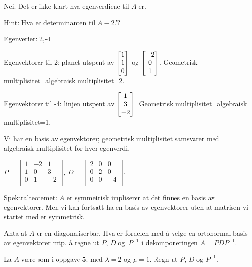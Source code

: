 \begin{losning}
\begin{punkt}
Nei. Det er ikke klart hva egenverdiene til $A$ er.
\end{punkt}

\begin{punkt}
Hint: Hva er determinanten til $A-2I$?
\end{punkt}

\begin{punkt}
Egenverier: 2,-4

\noindent
Egenvektorer til  2: planet utspent av $\begin{bmatrix} 1 \\ 1 \\ 0 \end{bmatrix}$ og $\begin{bmatrix} -2 \\ 0 \\ 1 \end{bmatrix}$. Geometrisk multiplisitet=algebraisk multiplisitet=2.

\noindent
Egenvektorer til  -4: linjen utspent av $\begin{bmatrix} 1 \\ 3 \\ -2 \end{bmatrix}$. Geometrisk multiplisitet=algebraisk multiplisitet=1.

\noindent
Vi har en basis av egenvektorer; geometrisk multiplisitet samsvarer med algebraisk multiplisitet for hver egenverdi.


\end{punkt}

\begin{punkt}
$P=\begin{bmatrix}
1 & -2 & 1\\
1 & 0 & 3\\
0 & 1 & -2\\
\end{bmatrix}$, $D=\begin{bmatrix}
2 & 0 & 0\\
0 & 2 & 0\\
0 & 0 & -4\\
\end{bmatrix}.$
\end{punkt}

\begin{punkt}
Spektralteoremet: $A$ er symmetrisk impliserer at det finnes en basis av egenvektorer. Men vi kan fortsatt ha en basis av egenvektorer uten at matrisen vi startet med er symmetrisk.
\end{punkt}

\end{losning}



\begin{oppgave}
\begin{punkt}
Anta at $A$ er en diagonaliserbar. Hva er fordelen med å velge en ortonormal basis av egenvektorer mtp. å regne ut $P$, $D$ og~$P^{-1}$ i dekomponeringen $A=PDP^{-1}$.
\end{punkt}

\begin{punkt}
La $A$ være som i oppgave $\mathbf{5.}$ med $\lambda=2$ og $\mu=1$. Regn ut $P$, $D$ og $P^{-1}$.
\end{punkt}

\end{oppgave}

